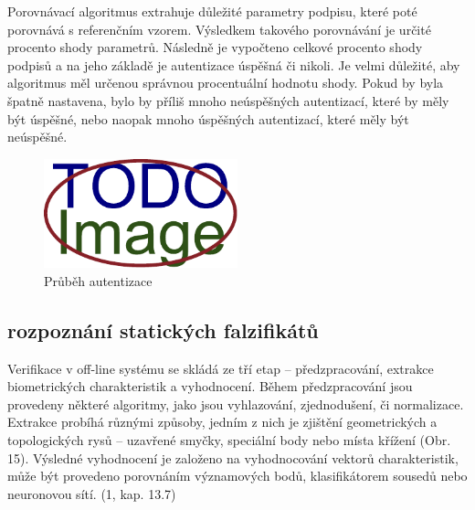 Porovnávací algoritmus extrahuje důležité parametry podpisu, které poté porovnává s referenčním vzorem. 
Výsledkem takového porovnávání je určité procento shody parametrů.
Následně je vypočteno celkové procento shody podpisů a na jeho základě je autentizace úspěšná či nikoli.
Je velmi důležité, aby algoritmus měl určenou správnou procentuální hodnotu shody.
Pokud by byla špatně nastavena, bylo by příliš mnoho neúspěšných autentizací, které by měly být úspěšné, nebo naopak mnoho úspěšných autentizací, které měly být neúspěšné.


\begin{figure}[h]
\centering
\includegraphics[width=0.5\textwidth]{obrazky-figures/placeholder.pdf}
\caption{Průběh autentizace}
\label{fig:my-pdf}
\end{figure}

\subsection{rozpoznání statických falzifikátů}
Verifikace v off-line systému se skládá ze tří etap – předzpracování, extrakce biometrických
charakteristik a vyhodnocení. Během předzpracování jsou provedeny některé algoritmy, jako
jsou vyhlazování, zjednodušení, či normalizace. Extrakce probíhá různými způsoby, jedním
z nich je zjištění geometrických a topologických rysů – uzavřené smyčky, speciální body
nebo místa křížení (Obr. 15). Výsledné vyhodnocení je založeno na vyhodnocování vektorů
charakteristik, může být provedeno porovnáním významových bodů, klasifikátorem sousedů
nebo neuronovou sítí. (1, kap. 13.7) %

